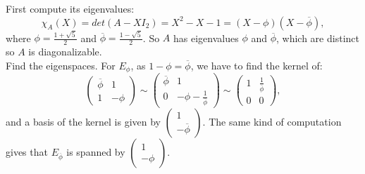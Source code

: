 First compute its eigenvalues:
\[\chi_A(X) = det (A -XI_2) = X^2 -X-1 = (X-\phi)(X-\overline{\phi}),\]
where $\phi = \frac{1+\sqrt 5}{2}$ and $\overline \phi = \frac{1-\sqrt 5}{2}$. So $A$ has eigenvalues $\phi$ and $\overline \phi$, which are distinct so $A$ is diagonalizable.\\

Find the eigenspaces. For $E_\phi$, as $1-\phi = \overline \phi$, we have to find the kernel of:
\[\begin{pmatrix} \overline \phi & 1 \\ 1 & -\phi  \end{pmatrix} \sim \begin{pmatrix} \overline \phi & 1 \\ 0 & -\phi-\frac{1}{\overline \phi}\end{pmatrix} \sim \begin{pmatrix}1 & \frac{1}{\overline \phi} \\ 0 & 0\end{pmatrix},\]
and a basis of the kernel is given by $\begin{pmatrix} 1 \\ -\overline \phi \end{pmatrix}$.
The same kind of computation gives that $E_{\overline \phi}$ is spanned by $\begin{pmatrix} 1 \\ -\phi \end{pmatrix}$.\\

